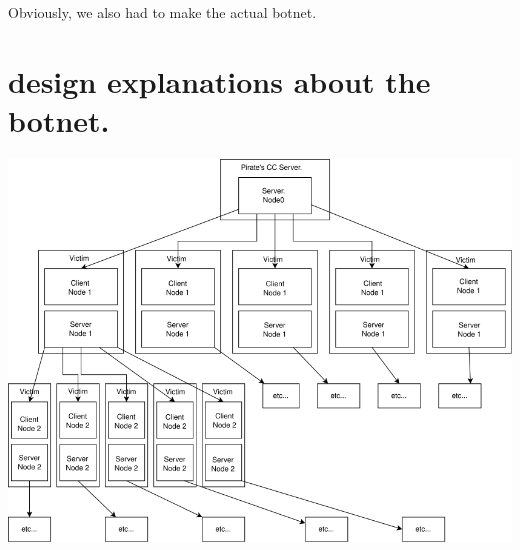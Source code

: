 \documentclass[../main.tex]{subfiles}
\begin{document}
    Obviously, we also had to make the actual botnet.


    \vspace{10pt}

    \section{design explanations about the botnet.}


    \includegraphics[width=450pt]{botnet.png}
\end{document}
